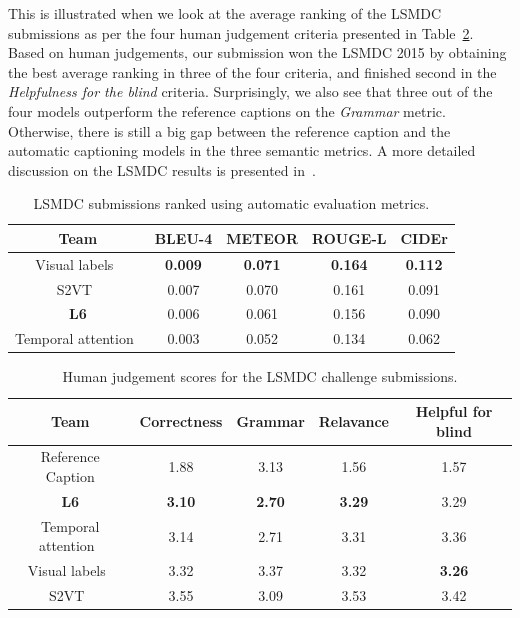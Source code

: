This is illustrated when we look at the average ranking of the LSMDC submissions
as per the four human judgement criteria presented in
Table~\ref{tab:resLsmdcTestHum}.
Based on human judgements, our submission won the LSMDC 2015 by obtaining
the best average ranking in three of the four criteria, and finished second in the
\emph{Helpfulness for the blind} criteria.
Surprisingly, we also see that three out of the four models outperform the reference
captions on the \emph{Grammar} metric.
Otherwise, there is still a big gap between the reference caption and the automatic
captioning models in the three semantic metrics.
A more detailed discussion on the LSMDC results is presented
in~\cite{DBLP:journals/corr/RohrbachTRTPLCS16}.

\begin{table}[tbh]
  \centering
  \newcommand{\bs}{\small\bf}
  \begin{adjustbox}{center}
  \begin{tabular}{||c|c|c|c|c|}
    \hline\hline
    \bf Team  &\bs BLEU-4 &\bs METEOR &\bs ROUGE-L &\bs CIDEr \\\hline\hline
    Visual labels~\cite{rohrbach2015long} &\bf0.009&\bf0.071&\bf0.164&\bf0.112\\
    S2VT~\cite{venugopalan2015sequence} & 0.007 & 0.070 & 0.161 & 0.091\\
    \bf L6               & 0.006 & 0.061 & 0.156 & 0.090\\
    Temporal attention~\cite{yao2015describing} & 0.003 & 0.052 & 0.134 & 0.062\\\hline
    \hline
  \end{tabular}
  \end{adjustbox}
  \caption{LSMDC submissions ranked using automatic evaluation metrics.}
  \label{tab:resLsmdcTestMet}
\end{table}

\begin{table}[tbh]
  \centering
  \newcommand{\bs}{\small\bf}
  \begin{adjustbox}{center}
  \begin{tabular}{||c|c|c|c|c|}
    \hline\hline
    \bf Team  &\bs Correctness &\bs Grammar &\bs Relavance & \bf Helpful for blind\\\hline\hline
    Reference Caption    & 1.88  & 3.13  & 1.56  & 1.57\\\hline
    \bf L6               &\bf3.10&\bf2.70&\bf3.29&3.29\\
    Temporal attention~\cite{yao2015describing} & 3.14  & 2.71  & 3.31  & 3.36\\
    Visual labels~\cite{rohrbach2015long}& 3.32  & 3.37  & 3.32  &\bf3.26\\
    S2VT~\cite{venugopalan2015sequence}& 3.55  & 3.09  & 3.53  & 3.42\\
    \hline
  \end{tabular}
  \end{adjustbox}
  \caption{Human judgement scores for the LSMDC challenge submissions.}
  \label{tab:resLsmdcTestHum}
\end{table}

